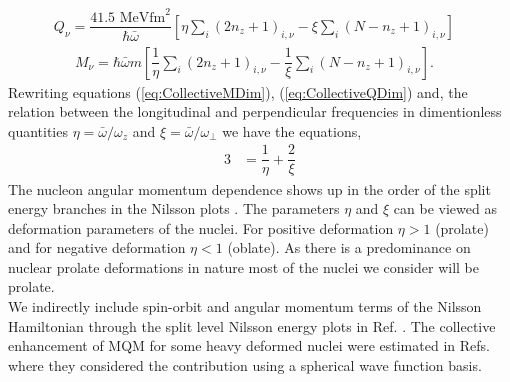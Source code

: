 \documentclass[10pt,a4paper, twoside, openright]{report}
\begin{document}
\begin{align}
Q_{\nu} = \dfrac{41.5\text{ MeV}\text{fm}^2}{\hbar\bar{\omega}}\left[\eta\sum_{i}\left(2n_z + 1\right)_{i,\nu}  - \xi\sum_{i}\left(N - n_z + 1\right)_{i,\nu}\right]&
\label{eq:QDimensionless}
\end{align}
\begin{align}
M_{\nu} = \hbar\bar{\omega}m\left[\dfrac{1}{\eta}\sum_{i}\left(2n_z + 1\right)_{i,\nu} - \dfrac{1}{\xi}\sum_{i}\left(N - n_z + 1\right)_{i,\nu}\right]. & \label{eq:MDimensionless}
\end{align}
Rewriting equations (\ref{eq:CollectiveMDim}), (\ref{eq:CollectiveQDim})  and, the relation between the longitudinal  and perpendicular frequencies in dimentionless quantities $\eta = \bar{\omega}/\omega_z$ and $\xi = \bar{\omega}/\omega_{\perp}$ we have the equations,
\begin{align}
3 &= \dfrac{1}{\eta} + \dfrac{2}{\xi} \label{eq:average} 
\end{align}
The nucleon angular momentum dependence shows up in the order of the split energy branches in the Nilsson plots \cite{Nilsson1955, BohrMottVol2}.
The parameters $\eta$ and $\xi$ can be viewed as deformation parameters of the nuclei. For positive deformation $\eta > 1$ (prolate) and for negative deformation $\eta < 1$ (oblate). As there is a predominance on nuclear prolate deformations in nature most of the nuclei we consider will be prolate. \\
\linebreak
We indirectly include spin-orbit and angular momentum terms of the Nilsson Hamiltonian through the split level Nilsson energy plots in Ref. \cite{BohrMottVol2}.
The collective enhancement of MQM for some  heavy deformed nuclei were estimated in Refs. \cite{Flambaum1994, Flambaum2014} where they considered the contribution using a spherical wave function basis. 
\end{document}
